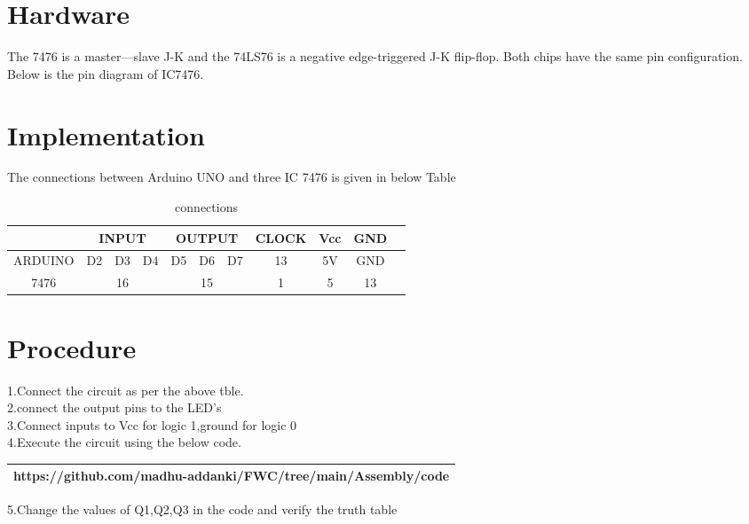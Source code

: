 \documentclass[journal,12pt]{article}
\begin{document}
\section{Hardware}
        The 7476 is a master—slave J-K and the 74LS76 is a negative edge-triggered J-K flip-flop. Both chips have the same pin configuration. Below is the pin diagram of IC7476. \\
\begin{figure}[ih]
	\centering
	
	\caption{}
	\label{pindiagram.}
\end{figure}
\section{Implementation}
The connections between Arduino UNO and three IC 7476 is given in below Table \\
\begin{table}[h]
	\begin{center}
	\begin{tabular}{|c|c|c|c|c|c|c|c|c|c|c|}
		\hline & \multicolumn{3}{|c|}{INPUT} & \multicolumn{3}{|c|}{OUTPUT} & CLOCK & Vcc & GND \\
		\hline ARDUINO & D2 & D3 & D4 & D5 & D6 & D7 & 13 & 5V & GND \\
		\hline 7476 & \multicolumn{3}{|c|}{16} & \multicolumn{3}{|c|}{15} & 1 & 5 & 13 \\
		\hline
	\end{tabular}
	\end{center}
	\caption{connections}
	\label{table:1}
\end{table}
\section{Procedure}
\begin{raggedright}
    1.Connect the circuit as per the above tble.\\
    2.connect the output pins to the LED's \\
    3.Connect inputs to Vcc for logic 1,ground for logic 0 \\
    4.Execute the circuit using the below code.\\
\begin{table}[h]
\centering
	\begin{tabular}{|c|}
	\hline
	https://github.com/madhu-addanki/FWC/tree/main/Assembly/code\\
	\hline
\end{tabular}
\end{table}
     5.Change the values of Q1,Q2,Q3 in the code and verify the truth table \\
\end{raggedright}

\end{document}

